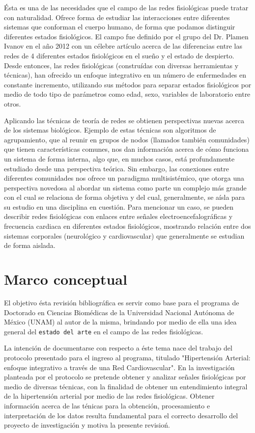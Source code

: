 \documentclass[twoside,twocolumn]{article}
\begin{document}
Ésta es una de las necesidades que el campo de las redes fisiológicas puede tratar con naturalidad.
Ofrece forma de estudiar las interacciones entre diferentes sistemas que conforman el cuerpo humano, de forma que podamos distinguir diferentes estados fisiológicos.
El campo fue definido por el grupo del Dr. Plamen Ivanov en el año 2012 con un célebre artículo acerca de las diferencias entre las redes de 4 diferentes estados fisiológicos en el sueño y el estado de despierto\cite{bashan2012network}.
Desde entonces, las redes fisiológicas (construídas con diversas herramientas y técnicas), han ofrecido un enfoque integrativo en un número de enfermedades en constante incremento, utilizando sus métodos para separar estados fisiológicos por medio de todo tipo de parámetros como edad, sexo, variables de laboratorio entre otros.

Aplicando las técnicas de teoría de redes se obtienen perspectivas nuevas acerca de los sistemas biológicos.
Ejemplo de estas técnicas son algoritmos de agrupamiento, que al reunir en grupos de nodos (llamados también comunidades) que tienen características comunes, nos dan información acerca de cómo funciona un sistema de forma interna, algo que, en muchos casos, está profundamente estudiado desde una perspectiva teórica.
Sin embargo, las conexiones entre diferentes comunidades nos ofrece un paradigma multisistémico, que otorga una perspectiva novedosa al abordar un sistema como parte un complejo más grande con el cual se relaciona de forma objetiva y del cual, generalmente, se aísla para su estudio en una disciplina en cuestión.
Para mencionar un caso, se pueden describir redes fisiológicas con enlaces entre señales electroencefalográficas y frecuencia cardiaca en diferentes estados fisiológicos, mostrando relación entre dos sistemas corporales (neurológico y cardiovascular) que generalmente se estudian de forma aislada\cite{bashan2012network}.


\section{Marco conceptual}
El objetivo ésta revisión bibliográfica es servir como base para el programa de Doctorado en Ciencias Biomédicas de la Universidad Nacional Autónoma de México (UNAM) al autor de la misma, brindando por medio de ella una idea general del \texttt{estado del arte} en el campo de las redes fisiológicas.

La intención de documentarse con respecto a éste tema nace del trabajo del protocolo presentado para el ingreso al programa, titulado "Hipertensión Arterial: enfoque integrativo a través de una Red Cardiovascular".
En la investigación planteada por el protocolo se pretende obtener y analizar señales fisiológicas por medio de diversas técnicas, con la finalidad de obtener un entendimiento integral de la hipertensión arterial por medio de las redes fisiológicas.
Obtener información acerca de las ténicas para la obtención, procesamiento e interpretación de los datos resulta fundamental para el correcto desarrollo del proyecto de investigación y motiva la presente revisioń.
\end{document}

